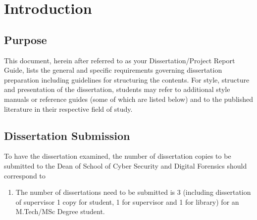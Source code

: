 \chapter{Introduction}
\section{Purpose}
This document, herein after referred to as your Dissertation/Project Report Guide, lists the general and specific requirements governing dissertation preparation including guidelines for structuring the contents. For style, structure and presentation of the dissertation, students may refer to additional style manuals or reference guides (some of which are listed below) and to the published literature in their respective field of study. \cite{ashton2009internet}
\section{Dissertation Submission }
To have the dissertation examined, the number of dissertation copies to be submitted to the Dean of School of Cyber Security and Digital Forensics should correspond to  \cite{Wifi}
\begin{enumerate}
	\item The number of dissertations need to be submitted is 3 (including dissertation of supervisor {1 copy for student, 1 for supervisor and 1 for library}) for an M.Tech/MSc Degree student.
\end{enumerate}